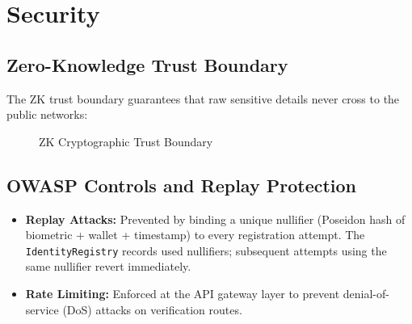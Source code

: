 \documentclass[12pt,a4paper,oneside]{report}
\begin{document}
\newpage

\chapter{Security}

\section{Zero-Knowledge Trust Boundary}
The ZK trust boundary guarantees that raw sensitive details never cross to the public networks:
\begin{figure}[H]
    \centering
    \caption{ZK Cryptographic Trust Boundary}
    \label{fig:trust_boundary}
\end{figure}

\section{OWASP Controls and Replay Protection}
\begin{itemize}
    \item \textbf{Replay Attacks:} Prevented by binding a unique nullifier (Poseidon hash of biometric + wallet + timestamp) to every registration attempt. The \texttt{IdentityRegistry} records used nullifiers; subsequent attempts using the same nullifier revert immediately.
    \item \textbf{Rate Limiting:} Enforced at the API gateway layer to prevent denial-of-service (DoS) attacks on verification routes.
\end{itemize}
\end{document}
